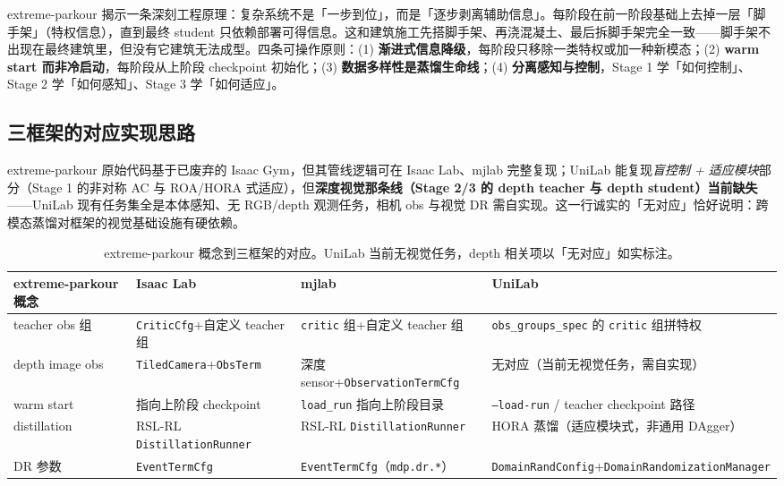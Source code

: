 \begin{insight}[复杂系统设计 = 逐步剥离脚手架]\label{ins:rlmc-priv-scaffold}
extreme-parkour 揭示一条深刻工程原理：复杂系统不是「一步到位」，而是「逐步剥离辅助信息」。每阶段在前一阶段基础上去掉一层「脚手架」（特权信息），直到最终 student 只依赖部署可得信息。这和建筑施工先搭脚手架、再浇混凝土、最后拆脚手架完全一致——脚手架不出现在最终建筑里，但没有它建筑无法成型。四条可操作原则：(1) \textbf{渐进式信息降级}，每阶段只移除一类特权或加一种新模态；(2) \textbf{warm start 而非冷启动}，每阶段从上阶段 checkpoint 初始化；(3) \textbf{数据多样性是蒸馏生命线}；(4) \textbf{分离感知与控制}，Stage 1 学「如何控制」、Stage 2 学「如何感知」、Stage 3 学「如何适应」。
\end{insight}

\subsection{三框架的对应实现思路}
\label{sec:rlmc-priv-parkour-frameworks}

extreme-parkour 原始代码基于已废弃的 Isaac Gym，但其管线逻辑可在 Isaac Lab、mjlab 完整复现；UniLab 能复现\emph{盲控制 + 适应模块}部分（Stage 1 的非对称 AC 与 ROA/HORA 式适应），但\textbf{深度视觉那条线（Stage 2/3 的 depth teacher 与 depth student）当前缺失}——UniLab 现有任务集全是本体感知、无 RGB/depth 观测任务，相机 obs 与视觉 DR 需自实现。这一行诚实的「无对应」恰好说明：跨模态蒸馏对框架的视觉基础设施有硬依赖。

\begin{table}[H]
\centering
\small
\caption{extreme-parkour 概念到三框架的对应。UniLab 当前无视觉任务，depth 相关项以「无对应」如实标注。}
\label{tab:rlmc-priv-parkourmap}
\begin{tabular}{@{}p{3.0cm}p{3.2cm}p{2.8cm}p{2.2cm}@{}}
\toprule
extreme-parkour 概念 & Isaac Lab & mjlab & UniLab \\
\midrule
teacher obs 组 & \texttt{CriticCfg}+自定义 teacher 组 & \texttt{critic} 组+自定义 teacher 组 & \texttt{obs\_groups\_spec} 的 \texttt{critic} 组拼特权 \\
depth image obs & \texttt{TiledCamera}+\texttt{ObsTerm} & 深度 sensor+\texttt{ObservationTermCfg} & 无对应（当前无视觉任务，需自实现） \\
warm start & 指向上阶段 checkpoint & \texttt{load\_run} 指向上阶段目录 & \texttt{--load-run} / teacher checkpoint 路径 \\
distillation & RSL-RL \texttt{DistillationRunner} & RSL-RL \texttt{DistillationRunner} & HORA 蒸馏（适应模块式，非通用 DAgger） \\
DR 参数 & \texttt{EventTermCfg} & \texttt{EventTermCfg}（\texttt{mdp.dr.*}） & \texttt{DomainRandConfig}+\texttt{DomainRandomizationManager} \\
\bottomrule
\end{tabular}
\end{table}

